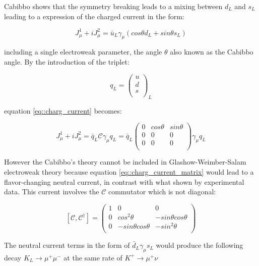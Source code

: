 Cabibbo shows that the symmetry breaking leads to a mixing between $d_{L}$ and $s_{L}$ leading to a expression of the charged current in the form:

\begin{equation}
J^{1}_{\mu} + i J^{2}_{\mu}= \bar{u}_{L}\gamma_{\mu} (cos\theta d_{L} + sin\theta s_{L})
\label{eq::charg_current}
\end{equation}

including a single electroweak parameter, the angle $\theta$ also known as the Cabibbo angle. By the introduction of the triplet:

\begin{equation}
q_{L} = 
\begin{pmatrix}
u \\
d \\
s \\
\end{pmatrix}
_{L}
\end{equation}

equation \ref{eq::charg_current} becomes:

\begin{equation}
J^{1}_{\mu} + i J^{2}_{\mu} = \bar{q}_{L}\mathcal{C}\gamma_{\mu}q_{L} =  \bar{q}_{L}
\begin{pmatrix}
0 &cos\theta &sin\theta \\
0 &0 &0 \\
0 &0 &0\\
\end{pmatrix}
\gamma_{\mu}q_{L}
\label{eq::charg_current_matrix}
\end{equation}

However the Cabibbo's theory cannot be included in Glashow-Weimber-Salam electroweak theory because equation \ref{eq::charg_current_matrix} would lead to a flavor-changing neutral current, in contrast with what shown by experimental data. This current involves the $\mathcal{C}$ commutator which is not diagonal:

\begin{equation}
\left[\mathcal{C}, \mathcal{C}^{\dagger} \right]
=
\begin{pmatrix}
1 &0 &0 \\
0 &cos^{2}\theta &-sin\theta cos\theta \\
0 &-sin\theta cos\theta &-sin^{2}\theta\\
\end{pmatrix}
\end{equation}

The neutral current terms in the form of $\bar{d}_{L}\gamma_{\mu}s_{L}$ would produce the following decay $K_{L} \longrightarrow \mu^{+}\mu^{-}$ at the same rate of $K^{+} \longrightarrow \mu^{+}\nu$

